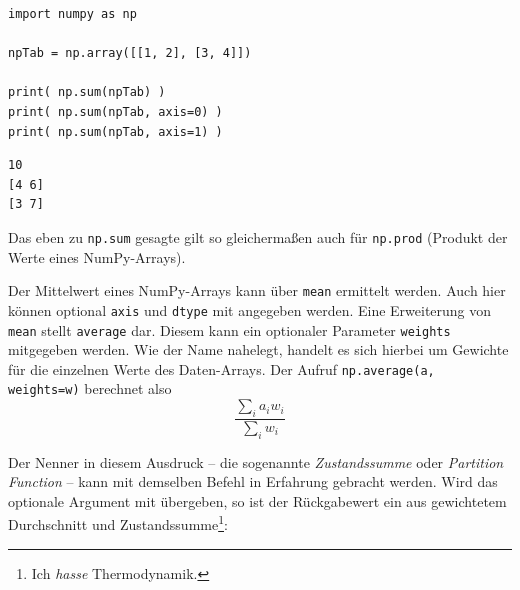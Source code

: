 \begin{tcbraster}[raster columns=2,
                  raster equal height,
                  nobeforeafter,
                  raster column skip=0.5cm]
\begin{codebox}
\begin{verbatim}
import numpy as np

npTab = np.array([[1, 2], [3, 4]])

print( np.sum(npTab) )
print( np.sum(npTab, axis=0) )
print( np.sum(npTab, axis=1) )
\end{verbatim}
\end{codebox}
%
\begin{cmdbox}
\begin{verbatim}
10
[4 6]
[3 7]
\end{verbatim}
\end{cmdbox}
\end{tcbraster}

Das eben zu \texttt{np.sum} gesagte gilt so gleichermaßen auch für \texttt{np.prod} (Produkt der Werte eines NumPy-Arrays).

Der Mittelwert eines NumPy-Arrays kann über \texttt{mean} ermittelt werden. Auch hier können optional \texttt{axis} und \texttt{dtype} mit angegeben werden. Eine Erweiterung von \texttt{mean} stellt \texttt{average} dar. Diesem kann ein optionaler Parameter \texttt{weights} mitgegeben werden. Wie der Name nahelegt, handelt es sich hierbei um Gewichte für die einzelnen Werte des Daten-Arrays. Der Aufruf \texttt{np.average(a, weights=w)} berechnet also
\[ \frac{\sum_i a_i w_i}{\sum_i w_i}\]

Der Nenner in diesem Ausdruck -- die sogenannte \emph{Zustandssumme} oder \emph{Partition Function} -- kann mit demselben Befehl in Erfahrung gebracht werden. Wird das optionale Argument  mit übergeben, so ist der Rückgabewert ein  aus gewichtetem Durchschnitt und Zustandssumme\footnote{Ich \emph{hasse} Thermodynamik.}:

